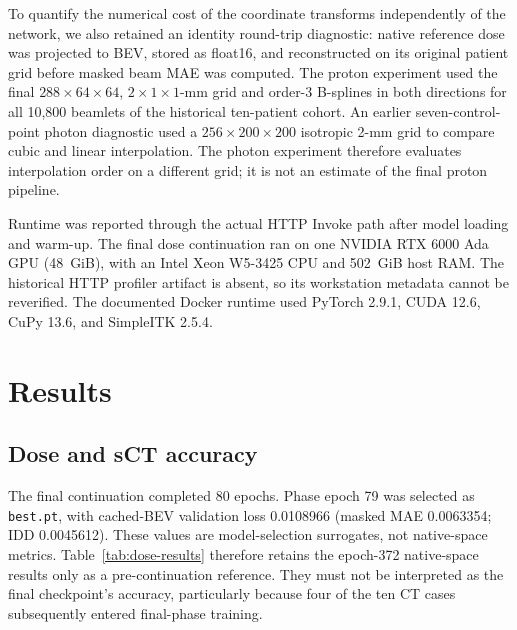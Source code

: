 \documentclass[runningheads]{llncs}
\begin{document}
To quantify the numerical cost of the coordinate transforms independently of
the network, we also retained an identity round-trip diagnostic: native
reference dose was projected to BEV, stored as float16, and reconstructed on
its original patient grid before masked beam MAE was computed. The proton
experiment used the final $288\times64\times64$, $2\times1\times1$-mm grid and
order-3 B-splines in both directions for all 10,800 beamlets of the historical
ten-patient cohort. An earlier seven-control-point photon diagnostic used a
$256\times200\times200$ isotropic 2-mm grid to compare cubic and linear
interpolation. The photon experiment therefore evaluates interpolation order
on a different grid; it is not an estimate of the final proton pipeline.

Runtime was reported through the actual HTTP Invoke path after model loading
and warm-up. The final dose continuation ran on one NVIDIA RTX 6000 Ada GPU
(48~GiB), with an Intel Xeon W5-3425 CPU and 502~GiB host RAM. The historical
HTTP profiler artifact is absent, so its workstation metadata cannot be
reverified. The documented Docker runtime used PyTorch 2.9.1, CUDA 12.6, CuPy
13.6, and SimpleITK 2.5.4.

\section{Results}

\subsection{Dose and sCT accuracy}

The final continuation completed 80 epochs. Phase epoch 79 was selected as
\texttt{best.pt}, with cached-BEV validation loss 0.0108966 (masked MAE
0.0063354; IDD 0.0045612). These values are model-selection surrogates, not
native-space metrics. Table~\ref{tab:dose-results} therefore retains the
epoch-372 native-space results only as a pre-continuation reference. They must
not be interpreted as the final checkpoint's accuracy, particularly because
four of the ten CT cases subsequently entered final-phase training.
\end{document}
